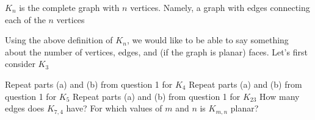 \documentclass[11pt]{exam}
\begin{document}
 $K_n$ is the complete graph with $n$ vertices. Namely, a graph with edges connecting each of the $n$ vertices 

\begin{questions}
\question Using the above definition of $K_n$, we would like to be able to say something about the number of vertices, edges, and (if the graph is planar) faces. Let's first consider $K_3$
\question Repeat parts (a) and (b) from question 1 for $K_4$ 
\vfill
\question Repeat parts (a) and (b) from question 1 for $K_5$
\vfill
\question Repeat parts (a) and (b) from question 1 for $K_{23}$
\vfill
\newpage
{}
\question How many edges does $K_{7,4}$ have?
\vfill
\question For which values of $m$ and $n$ is $K_{m,n}$ planar?
\vfill
\vfill
\end{questions}
%
\end{document}
